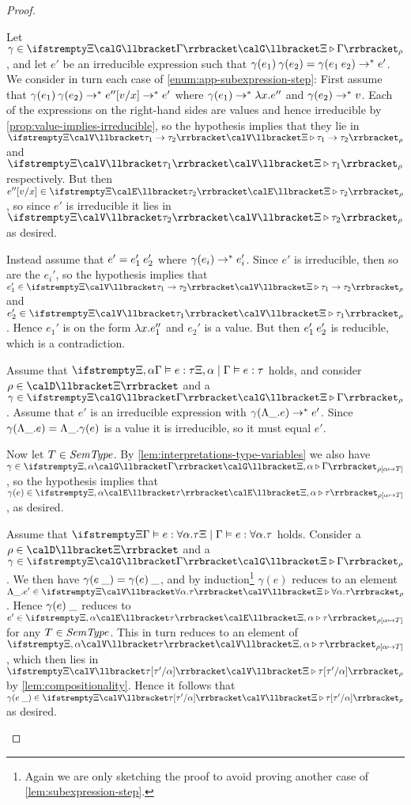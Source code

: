 \begin{proof}
\begin{proofsec*}
    \item[\ruleref{Tapp}]
    Let $\gamma \in \conInt{\Xi}{\Gamma}{\rho}$, and let $e'$ be an irreducible expression such that $\expApp{\gamma(e_1)}{\gamma(e_2)} = \gamma(\expApp{e_1}{e_2}) \step^* e'$. We consider in turn each case of \cref{enum:app-subexpression-step}: First assume that $\expApp{\gamma(e_1)}{\gamma(e_2)} \step^* e''[v/x] \step^* e'$ where $\gamma(e_1) \step^* \expLam{x}{e''}$ and $\gamma(e_2) \to^* v$. Each of the expressions on the right-hand sides are values and hence irreducible by \cref{prop:value-implies-irreducible}, so the hypothesis implies that they lie in $\valInt{\Xi}{\typeFunc{\tau_1}{\tau_2}}{\rho}$ and $\valInt{\Xi}{\tau_1}{\rho}$ respectively. But then $e''[v/x] \in \expInt{\Xi}{\tau_2}{\rho}$, so since $e'$ is irreducible it lies in $\valInt{\Xi}{\tau_2}{\rho}$ as desired.
    
    Instead assume that $e' = \expApp{e_1'}{e_2'}$ where $\gamma(e_i) \to^* e_i'$. Since $e'$ is irreducible, then so are the $e_i'$, so the hypothesis implies that $e_1' \in \valInt{\Xi}{\typeFunc{\tau_1}{\tau_2}}{\rho}$ and $e_2' \in \valInt{\Xi}{\tau_1}{\rho}$. Hence $e_1'$ is on the form $\expLam{x}{e_1''}$ and $e_2'$ is a value. But then $\expApp{e_1'}{e_2'}$ is reducible, which is a contradiction.

    \item[\ruleref{TTlam}]
    Assume that $\semtype{\Xi,\alpha}{\Gamma}{e}{\tau}$ holds, and consider $\rho \in \tvarInt{\Xi}$ and a $\gamma \in \conInt{\Xi}{\Gamma}{\rho}$. Assume that $e'$ is an irreducible expression with $\gamma(\expForall{\alpha}{e}) \to^* e'$. Since $\gamma(\expForall{\alpha}{e}) = \expForall{\alpha}{\gamma(e)}$ is a value it is irreducible, so it must equal $e'$.
    
    Now let $T \in \mathit{SemType}$. By \cref{lem:interpretations-type-variables} we also have $\gamma \in \conInt{\Xi,\alpha}{\Gamma}{\rho[\alpha \mapsto T]}$, so the hypothesis implies that $\gamma(e) \in \expInt{\Xi,\alpha}{\tau}{\rho[\alpha \mapsto T]}$, as desired.

    \item[\ruleref{TTapp}]
    Assume that $\semtype{\Xi}{\Gamma}{e}{\typeForall{\alpha}{\tau}}$ holds. Consider a $\rho \in \tvarInt{\Xi}$ and a $\gamma \in \conInt{\Xi}{\Gamma}{\rho}$. We then have $\gamma(\textcolor{black}{e}\:\_) = \textcolor{black}{\gamma(e)}\:\_$, and by induction\footnote{Again we are only sketching the proof to avoid proving another case of \cref{lem:subexpression-step}.} $\gamma(e)$ reduces to an element $\expForall{\alpha}{e'} \in \valInt{\Xi}{\typeForall{\alpha}{\tau}}{\rho}$. Hence $\textcolor{black}{\gamma(e)}\:\_$ reduces to $e' \in \expInt{\Xi,\alpha}{\tau}{\rho[\alpha \mapsto T]}$ for any $T \in \mathit{SemType}$. This in turn reduces to an element of $\valInt{\Xi,\alpha}{\tau}{\rho[\alpha \mapsto T]}$, which then lies in $\valInt{\Xi}{\tau[\tau'/\alpha]}{\rho}$ by \cref{lem:compositionality}. Hence it follows that $\gamma(\expTapp{e}{\alpha}) \in \valInt{\Xi}{\tau[\tau'/\alpha]}{\rho}$ as desired.
\end{proofsec*}
\end{proof}


